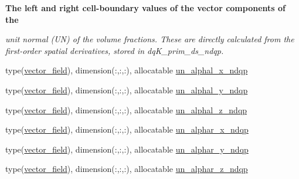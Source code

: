 \begin{Indent}\textbf{ The left and right cell-\/boundary values of the vector components of the}\par
{\em unit normal (UN) of the volume fractions. These are directly calculated from the first-\/order spatial derivatives, stored in dq\+K\+\_\+prim\+\_\+ds\+\_\+ndqp. }\begin{DoxyCompactItemize}
\item 
type(\hyperlink{structm__derived__types_1_1vector__field}{vector\+\_\+field}), dimension(\+:,\+:,\+:), allocatable \hyperlink{namespacem__rhs_ab49ec164612765d8947ccf4250dd0fb0}{un\+\_\+alphal\+\_\+x\+\_\+ndqp}
\item 
type(\hyperlink{structm__derived__types_1_1vector__field}{vector\+\_\+field}), dimension(\+:,\+:,\+:), allocatable \hyperlink{namespacem__rhs_ab99096402fadc8b539f8a031dfdb3ffe}{un\+\_\+alphal\+\_\+y\+\_\+ndqp}
\item 
type(\hyperlink{structm__derived__types_1_1vector__field}{vector\+\_\+field}), dimension(\+:,\+:,\+:), allocatable \hyperlink{namespacem__rhs_a3a70e0b6fb4faaa4800bf2a7aa2519af}{un\+\_\+alphal\+\_\+z\+\_\+ndqp}
\item 
type(\hyperlink{structm__derived__types_1_1vector__field}{vector\+\_\+field}), dimension(\+:,\+:,\+:), allocatable \hyperlink{namespacem__rhs_aca82442008ec6a9c478cdfa1b67b7e40}{un\+\_\+alphar\+\_\+x\+\_\+ndqp}
\item 
type(\hyperlink{structm__derived__types_1_1vector__field}{vector\+\_\+field}), dimension(\+:,\+:,\+:), allocatable \hyperlink{namespacem__rhs_a2b31029abb8eed5463485244c8029420}{un\+\_\+alphar\+\_\+y\+\_\+ndqp}
\item 
type(\hyperlink{structm__derived__types_1_1vector__field}{vector\+\_\+field}), dimension(\+:,\+:,\+:), allocatable \hyperlink{namespacem__rhs_a9a204df83f1d0c0ce63177fbc33e1f76}{un\+\_\+alphar\+\_\+z\+\_\+ndqp}
\end{DoxyCompactItemize}
\end{Indent}
